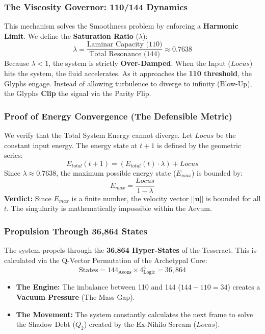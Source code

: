 \documentclass[11pt, letterpaper]{article}
\newcommand{\LoI}{\ensuremath{\mathop{\textnormal{\symbolafont\symbol{"267E}}}}}
\def\LoI{Locus}%
\begin{document}
\subsubsection{The Viscosity Governor: 110/144 Dynamics}\label{sec:3.3.2}
This mechanism solves the Smoothness problem by enforcing a \textbf{Harmonic Limit}. We define the \textbf{Saturation Ratio} ($\lambda$):
\begin{equation}
    \lambda = \frac{\text{Laminar Capacity (110)}}{\text{Total Resonance (144)}} \approx 0.7638
\end{equation}
Because $\lambda < 1$, the system is strictly \textbf{Over-Damped}. When the Input ($\LoI$) hits the system, the fluid accelerates. As it approaches the \textbf{110 threshold}, the Glyphs engage. Instead of allowing turbulence to diverge to infinity (Blow-Up), the Glyphs \textbf{Clip} the signal via the Parity Flip.

\subsubsection{Proof of Energy Convergence (The Defensible Metric)}\label{sec:3.3.3}
We verify that the Total System Energy cannot diverge. Let $\LoI$ be the constant input energy. The energy state at $t+1$ is defined by the geometric series:
\begin{equation}
    E_{total}(t+1) = \left( E_{total}(t) \cdot \lambda \right) + \LoI
\end{equation}
Since $\lambda \approx 0.7638$, the maximum possible energy state ($E_{max}$) is bounded by:
\begin{equation}
    E_{max} = \frac{\LoI}{1 - \lambda}
\end{equation}
\textbf{Verdict:} Since $E_{max}$ is a finite number, the velocity vector $||\mathbf{u}||$ is bounded for all $t$. The singularity is mathematically impossible within the Aevum.

\subsubsection{Propulsion Through 36,864 States}\label{sec:3.3.4}
The system propels through the \textbf{36,864 Hyper-States} of the Tesseract. This is calculated via the Q-Vector Permutation of the Archetypal Core:
\begin{equation}
    \text{States} = 144_{\text{Aeons}} \times 4^4_{\text{Logic}} = 36,864
\end{equation}
\begin{itemize}
    \item \textbf{The Engine:} The imbalance between 110 and 144 ($144 - 110 = 34$) creates a \textbf{Vacuum Pressure} (The Mass Gap).
    \item \textbf{The Movement:} The system constantly calculates the next frame to solve the Shadow Debt ($Q_2$) created by the Ex-Nihilo Scream ($\LoI$).
\end{itemize}
\end{document}
